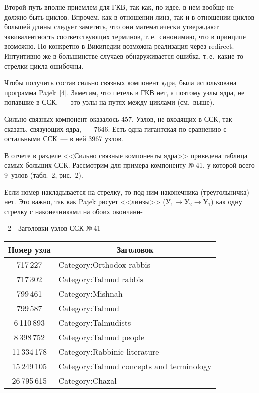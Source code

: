 \begin{multicols}{2}
   Второй путь вполне приемлем для ГКВ, так как, по идее, в нем вообще не должно быть 
циклов. Впрочем, как в отношении линз, так и в отношении циклов большей длины следует 
заметить, что они математически утверждают эквивалентность соответствующих терминов, 
т.\,е.\ синонимию, что в принципе возможно. Но конкретно в Википедии возможна реализация
через {\sf redirect}. Интуитивно же в большинстве случаев обнаруживается ошибка, 
т.\,е.\ ка\-кие-то стрелки цикла ошибочны.
   
   Чтобы получить состав сильно связных компонент ядра, была использована программа 
Pajek~[4]. Заметим, что петель в ГКВ нет, а поэтому узлы ядра, не попавшие в ССК,~--- это 
узлы на путях между циклами (см.\ выше).
   
   Сильно связных компонент оказалось 457. Узлов, не входящих в ССК, так сказать, 
   связующих ядра,~--- 7646. 
Есть одна гигантская по сравнению с остальными ССК~--- в ней 3967 узлов.
   
   В отчете в разделе <<Сильно связные компоненты ядра>> приведена таблица самых 
больших ССК. Рассмотрим для примера компоненту №\,41, у которой всего 9~узлов 
(табл.~2, рис.~2).

   
   Если номер накладывается на стрелку, то под ним наконечника (треугольничка) нет. Это 
важно, так как Pajek рисует <<линзы>> ($\mathrm{У}_1\rightarrow \mathrm{У}_2\rightarrow 
\mathrm{У}_1$) как одну стрелку с наконечниками на обоих окончани-\linebreak\vspace*{-12pt}

\vspace*{6pt}


  \begin{center}  %
{\tablename~2}\ \ \small{Заголовки узлов ССК №\,41}

\vspace*{6pt}

{\small   
\tabcolsep=3.5pt
\begin{tabular}{|c|l|}
   \hline
Номер узла&\multicolumn{1}{c|}{Заголовок}\\
\hline
717\,227&Category:Orthodox rabbis\\
717\,302&Category:Talmud rabbis\\
799\,461&Category:Mishnah\\
799\,587&Category:Talmud\\
6\,110\,893\hphantom{\,9}&Category:Talmudists\\
8\,398\,752\hphantom{\,9}&Category:Talmud people\\
11\,334\,178\hphantom{\,99}&Category:Rabbinic literature\\
15\,249\,105\hphantom{\,99}&Category:Talmud concepts and terminology\\
26\,795\,615\hphantom{\,99}&Category:Chazal\\
\hline
\end{tabular}
}
\end{center}


\end{multicols}
